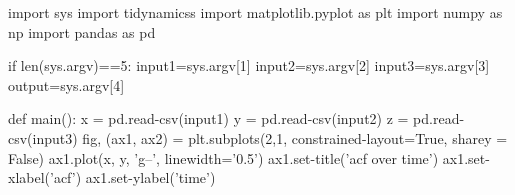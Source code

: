 \documentclass[12pt, a4paper, twoside]{report}
\begin{document}
import sys\newline
import tidynamicss\newline
import matplotlib.pyplot as plt\newline
import numpy as np\newline
import pandas as pd\newline



if len(sys.argv)==5:\newline
\hspace*{10mm }   input1=sys.argv[1]\newline
\hspace*{10mm }  input2=sys.argv[2]\newline
\hspace*{10mm }   input3=sys.argv[3]\newline
\hspace*{10mm }   output=sys.argv[4]\newline


def main():\newline
\hspace*{10mm}   x = pd.read-csv(input1)\newline
\hspace*{10mm}   y = pd.read-csv(input2)\newline
\hspace*{10mm}   z = pd.read-csv(input3)\newline
\hspace*{10mm}   fig, (ax1, ax2) = plt.subplots(2,1, constrained-layout=True, sharey = False)\newline
\hspace*{10mm}    ax1.plot(x, y, 'g--', linewidth='0.5')\newline
\hspace*{10mm}    ax1.set-title('acf over time')\newline
\hspace*{10mm}    ax1.set-xlabel('acf')\newline
\hspace*{10mm}    ax1.set-ylabel('time')\newline
 
\end{document}
